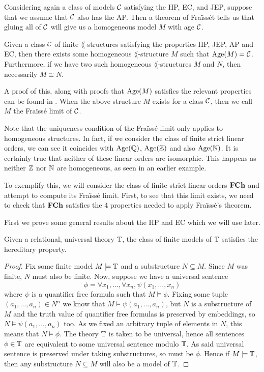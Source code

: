 Considering again a class of models $\mathcal{C}$ satisfying the HP, EC, and JEP, suppose that we assume that
$\mathcal{C}$ also has the AP. Then a theorem of Fraïssét tells us that gluing all of $\mathcal{C}$ will give us a
homogeneous model $M$ with age $\mathcal{C}$.

\begin{thm}
  Given a class $\mathcal{C}$ of finite $\lang$-structures satisfying the properties HP, JEP, AP and EC, then
  there exists some homogeneous $\lang$-structure $M$ such that $\operatorname{Age}(M) = \mathcal{C}$. Furthermore, if we
  have two such homogeneous $\lang$-structures $M$ and $N$, then necessarily $M \cong N$.
\end{thm}

A proof of this, along with proofs that $\operatorname{Age}(M)$ satisfies the relevant properties can be found in
\cite{hodges93}. When the above structure $M$ exists for a class $\mathcal{C}$, then we call $M$ the Fraïssé
limit of $\mathcal{C}$.

Note that the uniqueness condition of the Fraïssé limit only applies to homogeneous
structures. In fact, if we consider the class of finite strict linear orders, we can see it
coincides with $\operatorname{Age}(\mathbb{Q})$, $\operatorname{Age}(\mathbb{Z})$ and also $\operatorname{Age}(\mathbb{N})$. It is certainly true that neither of
these linear orders are isomorphic. This happens as neither $\mathbb{Z}$ nor $\mathbb{N}$ are homogeneous,
as seen in an earlier example.

To exemplify this, we will consider the class of finite strict linear orders $\textbf{FCh}$ and attempt
to compute its Fraïssé limit. First, to see that this limit exists, we need to check that $\textbf{FCh}$
satisfies the 4 properties needed to apply Fraïssé's theorem.

First we prove some general results about the HP and EC which we will use later.

\begin{prop}
  Given a relational, universal theory $\mathbb{T}$, the class of finite models of $\mathbb{T}$ satisfies
  the hereditary property.
\end{prop}
\begin{proof}
  Fix some finite model $M \models \mathbb{T}$ and a substructure
  $N \subseteq M$. Since $M$ was finite, $N$ must also be finite. Now, suppose we have a universal
  sentence
  \begin{equation*}
    \phi = \forall x_1, \dots, \forall x_n, \psi(x_1,\dots,x_n)
  \end{equation*}
  where $\psi$ is a quantifier free formula such that $M \models \phi$. Fixing some tuple $(a_1,\dots,a_n) \in N^n$ we
  know that $M \models \psi(a_1,\dots,a_n)$, but $N$ is a substructure of $M$ and the truth value
  of quantifier free formulas is preserved by embeddings, so $N \models \psi(a_1,\dots,a_n)$ too.
  As we fixed an arbitrary tuple of elements in $N$, this means that $N \models \phi$.
  The theory $\mathbb{T}$ is taken to be universal, hence all sentences $\phi \in \mathbb{T}$ are
  equivalent to some universal sentence modulo $\mathbb{T}$. As said universal sentence is preserved
  under taking substructures, so must be $\phi$. Hence if $M \models \mathbb{T}$, then any substructure
  $N \subseteq M$ will also be a model of $\mathbb{T}$.
\end{proof}

